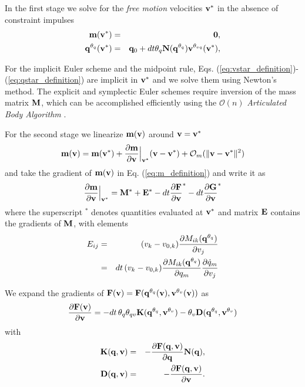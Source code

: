 In the first stage we solve for the
\textit{free motion} velocities ${\mathbf{v}}^*$ in the absence of constraint impulses
\begin{eqnarray}
	\mf{m}(\mf{v}^*) &=& \mf{0},
	\label{eq:vstar_definition}\\
	\mf{q}^{\theta_q}(\mf{v}^*) &=& \mf{q}_0 + dt\theta_q\mf{N}(\mf{q}^{\theta_{q}})\mf{v}^{\theta_{vq}}(\mf{v}^*),
	\label{eq:qstar_definition}
\end{eqnarray}

For the implicit Euler scheme and the midpoint rule, Eqs.
(\ref{eq:vstar_definition})-(\ref{eq:qstar_definition}) are implicit in
${\mathbf{v}}^*$ and we solve them using Newton's method. The explicit and symplectic
Euler schemes require inversion of the mass matrix ${\mathbf{M}}$, which can be
accomplished efficiently using the $\mathcal{O}(n)$
\emph{Articulated Body Algorithm}
\cite{bib:featherstone2008_rigid_body_dynamics_algorithms}.

For the second stage we linearize ${\mathbf{m}}({\mathbf{v}})$ around ${\mathbf{v}} = {\mathbf{v}}^*$ 
\begin{eqnarray}
	{\mathbf{m}}({\mathbf{v}}) = {\mathbf{m}}({\mathbf{v}}^*) +
	\frac{\partial{\mathbf{m}}}{\partial{\mathbf{v}}}\Bigr|_{{\mathbf{v}}^*}({\mathbf{v}}-{\mathbf{v}}^*) + \mathcal{O}_m(\Vert{\mathbf{v}}-{\mathbf{v}}^*\Vert^2)
\end{eqnarray}
and take the gradient of ${\mathbf{m}}({\mathbf{v}})$ in Eq. (\ref{eq:m_definition})
and write it as
\begin{eqnarray}
	\frac{\partial{\mathbf{m}}}{\partial{\mathbf{v}}}\Bigr|_{{\mathbf{v}}^*} = 
	{\mathbf{M}}^* + {\mathbf{E}}^* -
	dt\frac{\partial{\mathbf{F}}}{\partial{\mathbf{v}}}^* -
	dt\frac{\partial{\mathbf{G}}}{\partial{\mathbf{v}}}^*
\end{eqnarray}
where the superscript $^*$ denotes quantities evaluated at ${\mathbf{v}}^*$ and matrix ${\mathbf{E}}$ contains the gradients of ${\mathbf{M}}$, with elements
\begin{eqnarray}
	E_{ij} &= &
	(v_k-v_{0,k}) 
	\frac{\partial M_{ik}({\mathbf{q}}^{\theta_q})}{\partial v_j}\nonumber\\
	&=&dt\,(v_k-v_{0,k}) 
	\frac{\partial M_{ik}({\mathbf{q}}^{\theta_q})}{\partial
	q_m}\frac{\partial\dot{q}_m}{\partial v_j}
\end{eqnarray}

We expand the gradients of ${\mathbf{F}}({\mathbf{v}})={\mathbf{F}}({\mathbf{q}}^{\theta_{q}}({\mathbf{v}}), {\mathbf{v}}^{\theta_v}({\mathbf{v}}))$ as
\begin{eqnarray}
	\frac{\partial{\mathbf{F}}({\mathbf{v}})}{\partial{\mathbf{v}}} =
	-dt\,\theta_q\theta_{qv}{\mathbf{K}}({\mathbf{q}}^{\theta_q}, {\mathbf{v}}^{\theta_v})-\theta_v{\mathbf{D}}({\mathbf{q}}^{\theta_q}, {\mathbf{v}}^{\theta_v})
\end{eqnarray}
with 
\begin{eqnarray}
	\mf{K}(\mf{q}, \mf{v})&=&-\frac{\partial \mf{F}(\mf{q}, \mf{v})}{\partial \mf{q}}\mf{N}(\mf{q}),\\
	\mf{D}(\mf{q}, \mf{v})&=&-\frac{\partial \mf{F}(\mf{q}, \mf{v})}{\partial \mf{v}}.
	\label{eq:dissipation_matrix}
\end{eqnarray}


